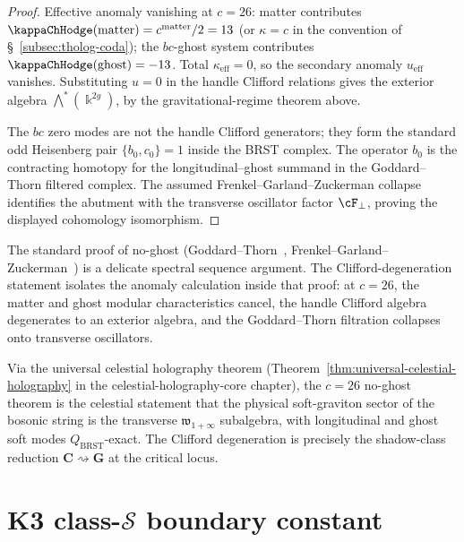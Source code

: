\begin{proof}
Effective anomaly vanishing at $c=26$: matter contributes
$\kappaChHodge(\text{matter}) = c^{\mathrm{matter}}/2 = 13$ (or
$\kappa = c$ in the convention of
\S~\ref{subsec:tholog-coda}); the $bc$-ghost system contributes
$\kappaChHodge(\text{ghost}) = -13$. Total $\kappa_{\mathrm{eff}}=0$,
so the secondary anomaly $u_{\mathrm{eff}}$ vanishes. Substituting
$u=0$ in the handle Clifford relations gives the exterior algebra
$\bigwedge^*(\Bbbk^{2g})$, by the gravitational-regime theorem above.

The $bc$ zero modes are not the handle Clifford generators; they form
the standard odd Heisenberg pair $\{b_0,c_0\}=1$ inside the BRST
complex. The operator $b_0$ is the contracting homotopy for the
longitudinal--ghost summand in the Goddard--Thorn filtered complex.
The assumed Frenkel--Garland--Zuckerman collapse identifies the
abutment with the transverse oscillator factor $\cF_\perp$, proving
the displayed cohomology isomorphism.
\end{proof}

\begin{remark}
\label{rem:clifford-to-no-ghost}
The standard proof of no-ghost (Goddard--Thorn~\cite{GoddardThornNoGhost},
Frenkel--Garland--Zuckerman~\cite{FrenkelGarlandZuckerman}) is a
delicate spectral sequence argument. The Clifford-degeneration
statement isolates the anomaly calculation inside that proof: at
$c=26$, the matter and ghost modular characteristics cancel, the
handle Clifford algebra degenerates to an exterior algebra, and the
Goddard--Thorn filtration collapses onto transverse oscillators.
\end{remark}

\begin{remark}
\label{rem:c26-celestial}
Via the universal celestial holography theorem
(Theorem~\ref{thm:universal-celestial-holography} in the
celestial-holography-core chapter), the $c=26$
no-ghost theorem is the celestial statement that the physical
soft-graviton sector of the bosonic string is the transverse
$\mathfrak{w}_{1+\infty}$ subalgebra, with longitudinal and ghost
soft modes $Q_{\mathrm{BRST}}$-exact. The Clifford degeneration
is precisely the shadow-class reduction $\mathbf C \rightsquigarrow
\mathbf G$ at the critical locus.
\end{remark}

\section{K3 class-\texorpdfstring{$\mathcal S$}{S} boundary constant}
\label{sec:csd-supplement}

